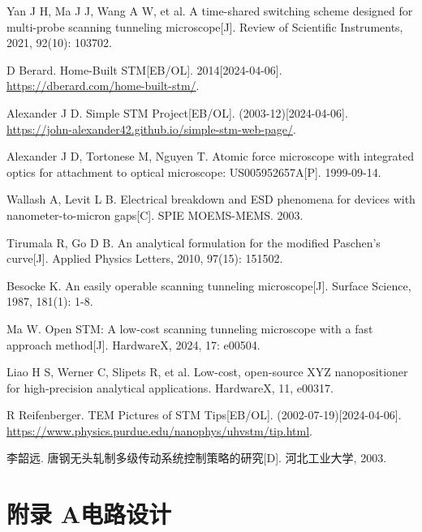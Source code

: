 \documentclass{article}
\begin{document}
\begin{spacing}{1.625}
\begin{thebibliography}{25}
		 Yan J H, Ma J J, Wang A W, et al. A time-shared switching scheme designed for multi-probe scanning tunneling microscope[J]. Review of Scientific Instruments, 2021, 92(10): 103702.
		
		 D Berard. Home-Built STM[EB/OL]. 2014[2024-04-06]. \href{https://dberard.com/home-built-stm/}{https://dberard.com/home-built-stm/}.
		
		 Alexander J D. Simple STM Project[EB/OL]. (2003-12)[2024-04-06]. \href{https://john-alexander42.github.io/simple-stm-web-page/}{https://john-alexander42.github.io/simple-stm-web-page/}.
		
		 Alexander J D, Tortonese M, Nguyen T. Atomic force microscope with integrated optics for attachment to optical microscope: US005952657A[P]. 1999-09-14.
		
		 Wallash A, Levit L B. Electrical breakdown and ESD phenomena for devices with nanometer-to-micron gaps[C]. SPIE MOEMS-MEMS. 2003. 
		
		 Tirumala R, Go D B. An analytical formulation for the modified Paschen’s curve[J]. Applied Physics Letters, 2010, 97(15): 151502.
		
		 Besocke K. An easily operable scanning tunneling microscope[J]. Surface Science, 1987, 181(1): 1-8.
		
		 Ma W. Open STM: A low-cost scanning tunneling microscope with a fast approach method[J]. HardwareX, 2024, 17: e00504.
		
		 Liao H S, Werner C, Slipets R, et al. Low-cost, open-source XYZ nanopositioner for high-precision analytical applications. HardwareX, 11, e00317.
		
		 R Reifenberger. TEM Pictures of STM Tips[EB/OL]. (2002-07-19)[2024-04-06]. \href{https://www.physics.purdue.edu/nanophys/uhvstm/tip.html}{https://www.physics.purdue.edu/nanophys/uhvstm/tip.html}.
		
		 李韶远. 唐钢无头轧制多级传动系统控制策略的研究[D]. 河北工业大学, 2003.
		
		
	\end{thebibliography}


\end{spacing}


\newpage
\appendix
\section*{附录 A\quad 电路设计}
\label{app:A}
\end{document}

